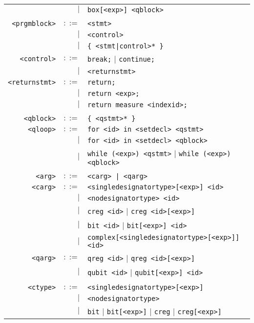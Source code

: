 \documentclass[notitlepage]{article}
\begin{document}
\begin{longtable}{rrl}
	    & $\mid$ & \texttt{box[<exp>] <qblock>} \\ \\
	\texttt{<prgmblock>} & $::=$ & \texttt{<stmt>} \\
	    & $\mid$ & \texttt{<control>} \\
	    & $\mid$ & \texttt{\{ <stmt|control>* \}} \\
	\texttt{<control>} & $::=$ & \texttt{break;} $\mid$ \texttt{continue;} \\
	    & $\mid$ & \texttt{<returnstmt>} \\
	\texttt{<returnstmt>} & $::=$ & \texttt{return;} \\
	    & $\mid$ & \texttt{return <exp>;} \\
	    & $\mid$ & \texttt{return measure <indexid>;} \\ \\
	\texttt{<qblock>} & $::=$ & \texttt{\{ <qstmt>* \}} \\
	\texttt{<qloop>} & $::=$ & \texttt{for <id> in <setdecl> <qstmt>} \\
	    & $\mid$ & \texttt{for <id> in <setdecl> <qblock>} \\
	    & $\mid$ & \texttt{while (<exp>) <qstmt>} $\mid$ \texttt{while (<exp>) <qblock>} \\ \\
	\texttt{<arg>} & $::=$ & \texttt{<carg> | <qarg>} \\
	\texttt{<carg>} & $::=$ & \texttt{<singledesignatortype>[<exp>] <id>} \\
	    & $\mid$ & \texttt{<nodesignatortype> <id>} \\
	    & $\mid$ & \texttt{creg <id>} $\mid$ \texttt{creg <id>[<exp>]} \\
	    & $\mid$ & \texttt{bit <id>} $\mid$ \texttt{bit[<exp>] <id>} \\
	    & $\mid$ & \texttt{complex[<singledesignatortype>[<exp>]] <id>} \\
	\texttt{<qarg>} & $::=$ & \texttt{qreg <id>} $\mid$ \texttt{qreg <id>[<exp>]} \\
	    & $\mid$ & \texttt{qubit <id>} $\mid$ \texttt{qubit[<exp>] <id>} \\ \\
	\texttt{<ctype>} & $::=$ & \texttt{<singledesignatortype>[<exp>]} \\
	    & $\mid$ & \texttt{<nodesignatortype>} \\
	    & $\mid$ & \texttt{bit} $\mid$ \texttt{bit[<exp>]} $\mid$ \texttt{creg} $\mid$ \texttt{creg[<exp>]} \\

\end{longtable}
\end{document}
